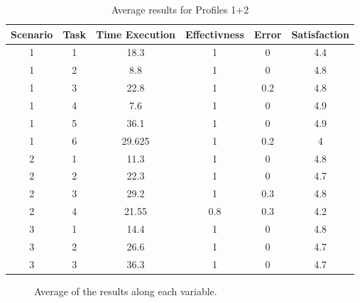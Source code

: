 \begin{table}[H]
  \begin{center}
    \begin{tabular}{||c|c|c|c|c|c||} %
      \textbf{Scenario} & \textbf{Task} & \textbf{Time Execution} & \textbf{Effectivness} & \textbf{Error} & \textbf{Satisfaction}\\
      
      \hline
        1 & 1 & 18.3 & 1 & 0 & 4.4\\
        1 & 2 & 8.8 & 1 & 0 & 4.8\\
        1 & 3 & 22.8 & 1 & 0.2 & 4.8\\
        1 & 4 & 7.6 & 1 & 0 & 4.9\\
        1 & 5 & 36.1 & 1 & 0 & 4.9\\
        1 & 6 & 29.625 & 1 & 0.2 & 4\\
        \hline
        2 & 1 & 11.3 & 1 & 0 & 4.8\\
        2 & 2 & 22.3 & 1 & 0 & 4.7\\
        2 & 3 & 29.2 & 1 & 0.3 & 4.8\\
        2 & 4 & 21.55 & 0.8 & 0.3 & 4.2\\
        \hline
        3 & 1 & 14.4 & 1 & 0 & 4.8\\
        3 & 2 & 26.6 & 1 & 0 & 4.7\\
        3 & 3 & 36.3 & 1 & 0 & 4.7\\
        \hline

    \end{tabular}
  \end{center}
  \caption{Average results for Profiles 1+2}
\end{table}

\bigskip

\begin{figure}[H]
  \centering
    \caption{Average of the results along each variable.}
\end{figure}
\bigskip
